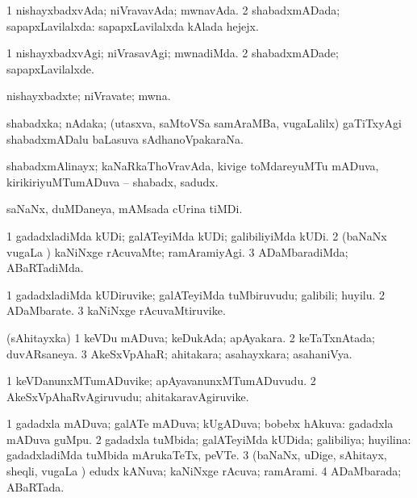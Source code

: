 \bentry
{}
\gl{\gu}
\bmng
\bnum
\num{1} nishayxbadxvAda; niVravavAda; mwnavAda. 
\num{2} shabadxmADada; sapapxLavilalxda:  sapapxLavilalxda kAlada hejejx. 
\enum
\emng
\eentry

\bentry
{}
\gl{\kirxvi}
\bmng
\bnum
\num{1} nishayxbadxvAgi; niVrasavAgi; mwnadiMda. 
\num{2} shabadxmADade; sapapxLavilalxde. 
\enum
\emng
\eentry

\bentry
{}
\gl{\nA}
\bmng
nishayxbadxte; niVravate; mwna. 
\emng
\eentry

\bentry
{}
\gl{\nA}
\bmng
shabadxka; nAdaka; (utasxva, saMtoVSa samAraMBa, \mo vugaLalilx) gaTiTxyAgi shabadxmADalu baLasuva sAdhanoVpakaraNa. 
\emng
\eentry

\bentry
{}
\gl{\nA}
\bmng
shabadxmAlinayx; kaNaRkaThoVravAda, kivige toMdareyuMTu mADuva, kirikiriyuMTumADuva -- shabadx, sadudx. 
\emng
\eentry

\bentry
{}
\gl{\nA}
\bmng
saNaNx, duMDaneya, mAMsada cUrina tiMDi. 
\emng
\eentry

\bentry
{}
\gl{\kirxvi}
\bmng
\bnum
\num{1} gadadxladiMda kUDi; galATeyiMda kUDi; galibiliyiMda kUDi. 
\num{2} (baNaNx \mo vugaLa \vi) kaNiNxge rAcuvaMte; ramAramiyAgi. 
\num{3} ADaMbaradiMda; ABaRTadiMda. 
\enum
\emng
\eentry

\bentry
{}
\gl{\nA}
\bmng
\bnum
\num{1} gadadxladiMda kUDiruvike; galATeyiMda tuMbiruvudu; galibili; huyilu. 
\num{2} ADaMbarate. 
\num{3} kaNiNxge rAcuvaMtiruvike. 
\enum
\emng
\eentry

\bentry
{}
\gl{\gu}
\bmng
(sAhitayxka) 
\bnum
\num{1} keVDu mADuva; keDukAda; apAyakara. 
\num{2} keTaTxnAtada; duvARsaneya. 
\num{3} AkeSxVpAhaR; ahitakara; asahayxkara; asahaniVya. 
\enum
\emng
\eentry

\bentry
{}
\gl{\nA}
\bmng
\bnum
\num{1} keVDanunxMTumADuvike; apAyavanunxMTumADuvudu. 
\num{2} AkeSxVpAhaRvAgiruvudu; ahitakaravAgiruvike. 
\enum
\emng
\eentry

\bentry
{}
\gl{\gu}
\bmng
\bnum
\num{1} gadadxla mADuva; galATe mADuva; kUgADuva; bobebx hAkuva:  gadadxla mADuva guMpu. 
\num{2} gadadxla tuMbida; galATeyiMda kUDida; galibiliya; huyilina:  gadadxladiMda tuMbida mArukaTeTx, peVTe. 
\num{3} (baNaNx, uDige, sAhitayx, sheqli, \mo vugaLa \vi) edudx kANuva; kaNiNxge rAcuva; ramArami. 
\num{4} ADaMbarada; ABaRTada. 
\enum
\emng
\eentry

